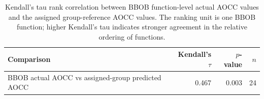 \begin{table}[htbp]
\centering
\small
\caption{Kendall's tau rank correlation between BBOB function-level actual AOCC values and the assigned group-reference AOCC values. The ranking unit is one BBOB function; higher Kendall's tau indicates stronger agreement in the relative ordering of functions.}
\label{tab:bbob-hof-ranking-summary-0307}
\begin{tabular}{lrrr}
\toprule
Comparison & Kendall's $\tau$ & $p$-value & $n$ \\
\midrule
BBOB actual AOCC vs assigned-group predicted AOCC & 0.467 & 0.003 & 24 \\
\bottomrule
\end{tabular}
\end{table}
